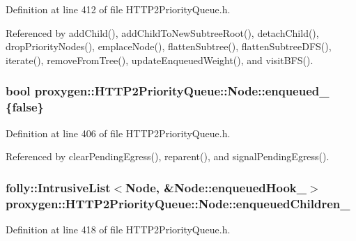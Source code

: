 Definition at line 412 of file H\+T\+T\+P2\+Priority\+Queue.\+h.



Referenced by add\+Child(), add\+Child\+To\+New\+Subtree\+Root(), detach\+Child(), drop\+Priority\+Nodes(), emplace\+Node(), flatten\+Subtree(), flatten\+Subtree\+D\+F\+S(), iterate(), remove\+From\+Tree(), update\+Enqueued\+Weight(), and visit\+B\+F\+S().

\subsubsection[{enqueued\+\_\+}]{\setlength{\rightskip}{0pt plus 5cm}bool proxygen\+::\+H\+T\+T\+P2\+Priority\+Queue\+::\+Node\+::enqueued\+\_\+ \{false\}\hspace{0.3cm}{\ttfamily [private]}}\label{classproxygen_1_1HTTP2PriorityQueue_1_1Node_aae050ef4f2e8f36a5b5f15fe4b2f7735}


Definition at line 406 of file H\+T\+T\+P2\+Priority\+Queue.\+h.



Referenced by clear\+Pending\+Egress(), reparent(), and signal\+Pending\+Egress().

\subsubsection[{enqueued\+Children\+\_\+}]{\setlength{\rightskip}{0pt plus 5cm}folly\+::\+Intrusive\+List$<${\bf Node}, \&{\bf Node\+::enqueued\+Hook\+\_\+}$>$ proxygen\+::\+H\+T\+T\+P2\+Priority\+Queue\+::\+Node\+::enqueued\+Children\+\_\+\hspace{0.3cm}{\ttfamily [private]}}\label{classproxygen_1_1HTTP2PriorityQueue_1_1Node_afc68859ccd5c9a6f71d064b7a2a58b82}


Definition at line 418 of file H\+T\+T\+P2\+Priority\+Queue.\+h.



